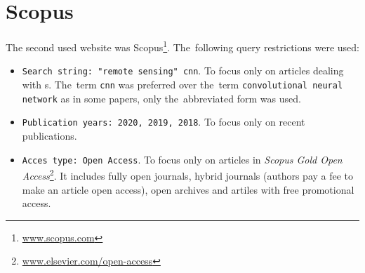 




\section{Scopus}
\label{scopus}

The second used website was Scopus\footnote{\url{www.scopus.com}}. The~following query restrictions were used:

\begin{itemize}
	\item \verb|Search string: "remote sensing" cnn|. To focus only on articles dealing with s. The~term \verb|cnn| was preferred over the~term \verb|convolutional neural network| as in some papers, only the~abbreviated form was used.
	\item \verb|Publication years: 2020, 2019, 2018|. To focus only on recent publications.
	\item \verb|Acces type: Open Access|. To focus only on articles in \textit{Scopus Gold Open Access}\footnote{\url{www.elsevier.com/open-access}}. It includes fully open journals, hybrid journals (authors pay a fee to make an article open access), open archives and artiles with free promotional access.
\end{itemize}

